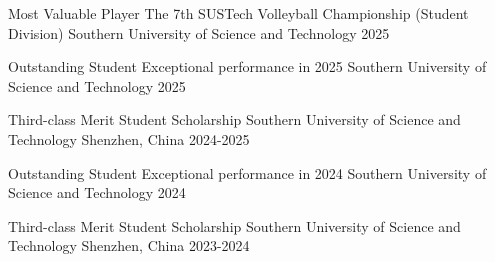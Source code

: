 

\begin{cvhonors}

  \cvhonor
    {Most Valuable Player} %
    {The 7th SUSTech Volleyball Championship (Student Division)} %
    {Southern University of Science and Technology} %
    {2025} %

  \cvhonor
    {Outstanding Student} %
    {Exceptional performance in 2025} %
    {Southern University of Science and Technology} %
    {2025} %

  \cvhonor
    {Third-class Merit Student Scholarship} %
    {Southern University of Science and Technology} %
    {Shenzhen, China} %
    {2024-2025} %

  \cvhonor
    {Outstanding Student} %
    {Exceptional performance in 2024} %
    {Southern University of Science and Technology} %
    {2024} %

  \cvhonor
    {Third-class Merit Student Scholarship} %
    {Southern University of Science and Technology} %
    {Shenzhen, China} %
    {2023-2024} %

\end{cvhonors}
